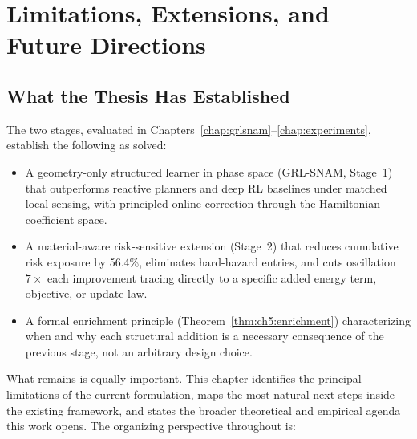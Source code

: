 
\chapter{Limitations, Extensions, and Future Directions}
\label{chap:limitations}

\providecommand{\Ham}{\mathcal{H}}
\providecommand{\Potential}{\mathcal{R}}
\providecommand{\PhaseState}{z}
\providecommand{\Pos}{q}
\providecommand{\Mom}{p}
\providecommand{\Mass}{\mathrm{M}}
\providecommand{\J}{\mathbb{J}}

\section{What the Thesis Has Established}
\label{sec:ch7:achieved}

The two stages, evaluated in Chapters~\ref{chap:grlsnam}--\ref{chap:experiments},
establish the following as solved:

\begin{itemize}
  \item A geometry-only structured learner in phase space
        (GRL-SNAM, Stage~1) that outperforms reactive planners and
        deep RL baselines under matched local sensing, with
        principled online correction through the Hamiltonian
        coefficient space.
  \item A material-aware risk-sensitive extension (Stage~2) that
        reduces cumulative risk exposure by 56.4\%, eliminates
        hard-hazard entries, and cuts oscillation $7\times$ each
        improvement tracing directly to a specific added energy
        term, objective, or update law.
  \item A formal enrichment principle
        (Theorem~\ref{thm:ch5:enrichment}) characterizing when and
        why each structural addition is a necessary consequence of
        the previous stage, not an arbitrary design choice.
\end{itemize}

What remains is equally important.
This chapter identifies the principal limitations of the current
formulation, maps the most natural next steps inside the existing
framework, and states the broader theoretical and empirical agenda
this work opens.
The organizing perspective throughout is:

